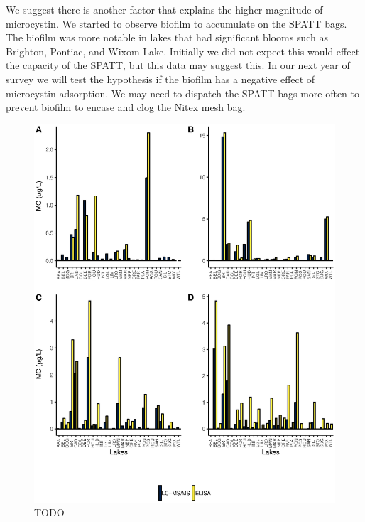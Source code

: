 We suggest there is another factor that explains the higher magnitude of microcystin. We started to observe biofilm to accumulate on the SPATT bags. The biofilm was more notable in lakes that had significant blooms such as Brighton, Pontiac, and Wixom Lake. Initially we did not expect this would effect the capacity of the SPATT, but this data may suggest this. In our next year of survey we will test the hypothesis if the biofilm has a negative effect of microcystin adsorption. We may need to dispatch the SPATT bags more often to prevent biofilm to encase and clog the Nitex mesh bag.

\begin{figure}[!h]
	\includegraphics[width=\textwidth]{figures/compare}
	\caption{TODO}
	\label{fig:compare}
\end{figure}



